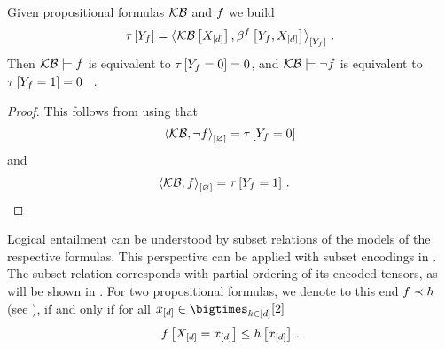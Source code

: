 \begin{theorem}
    \label{the:entailmentContradictionContraction}
    Given propositional formulas $\mathcal{KB}$ and $f$ we build
    \begin{align*}
        \hypercoreat{\exformulavar}
        = \contractionof{\kbat{\shortcatvariables},\formulaccwith}{\exformulavar} \, .
    \end{align*}
    Then $\mathcal{KB}\models f$ is equivalent to $\tau\left[Y_{f}=0\right]=0$, and $\mathcal{KB}\models\lnot f$ is equivalent to $\tau\left[Y_{f}=1\right]=0$ \, .
\end{theorem}
\begin{proof}
    This follows from  using that
    \begin{align*}
        \left\langle \mathcal{KB},\lnot f\right\rangle_{\left[ \varnothing \right]} = \tau\left[Y_{f}=0\right]
    \end{align*}
    and
    \begin{align*}
        \left\langle \mathcal{KB},f\right\rangle_{\left[ \varnothing \right]} = \tau\left[Y_{f}=1\right] \, . & \qedhere
    \end{align*}
\end{proof}






Logical entailment can be understood by subset relations of the models of the respective formulas.
This perspective can be applied with subset encodings in .
The subset relation corresponds with partial ordering of its encoded tensors, as will be shown in .
For two propositional formulas, we denote to this end $f\prec h$ (see ), if and only if for all $\shortatomindicesin$
\begin{align*}
    f\left[X_{[d]}=x_{[d]}\right] \leq h\left[x_{[d]}\right]  \, .
\end{align*}

